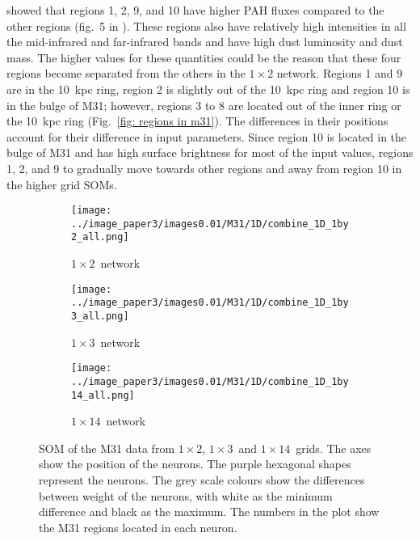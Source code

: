         \cite{Dim15} showed that regions 1, 2, 9, and 10 have higher PAH fluxes compared to the other regions (fig.~5 in \citealt{Dim15}). 
        These regions also have relatively high intensities in all the mid-infrared and far-infrared bands and have high dust luminosity and dust mass.
        The higher values for these quantities could be the reason that these four regions become separated from the others in the $1\times2$ network.
        Regions 1 and 9 are in the 10~kpc ring, region 2 is slightly out of the 10~kpc ring and region 10 is in the bulge of M31; however, regions 3 to 8 are located out of the inner ring or the 10~kpc ring (Fig.~\ref{fig: regions in m31}).   
        The differences in their positions account for their difference in input parameters.
        Since region 10 is located in the bulge of M31 and has high surface brightness for most of the input values, regions 1, 2, and 9 to gradually move towards other regions and away from region 10 in the higher grid SOMs.
       
    \begin{figure}
    \begin{subfigure}[b]{\textwidth}
        \centering
        \texttt{[image: ../image\_paper3/images0.01/M31/1D/combine\_1D\_1by2\_all.png]}
        \caption{$1\times2$~network}
    \label{fig: M31_net_1by2}
    \end{subfigure}
    \hfill
    \begin{subfigure}[b]{\textwidth}
        \texttt{[image: ../image\_paper3/images0.01/M31/1D/combine\_1D\_1by3\_all.png]}
         \caption{$1\times3$~network}
        \label{fig: M31_net_1by3}
    \end{subfigure}
    \hfill
    \begin{subfigure}[b]{\textwidth}
        \texttt{[image: ../image\_paper3/images0.01/M31/1D/combine\_1D\_1by14\_all.png]}
        \caption{$1\times14$~network}
        \label{fig: M31_net_1by14}
    \end{subfigure}
   \caption[One-dimensional self-organizing map of M31 data]{SOM of the M31 data from $1\times2$, $1\times3$~and $1\times14$~grids. The axes show the position of the neurons. The purple hexagonal shapes represent the neurons. The grey scale colours show the differences between weight of the neurons, with white as the minimum difference and black as the maximum. The numbers in the plot show the M31 regions located in each neuron.}
   \label{fig: M31_nets_1d}
    \end{figure}
    

